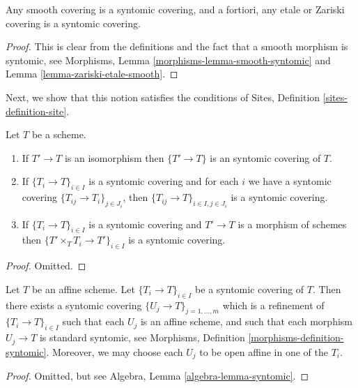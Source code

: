 \begin{lemma}
\label{lemma-zariski-etale-smooth-syntomic}
Any smooth covering is a syntomic covering, and a fortiori,
any etale or Zariski covering is a syntomic covering.
\end{lemma}

\begin{proof}
This is clear from the definitions and the fact that a smooth
morphism is syntomic, see
Morphisms, Lemma \ref{morphisms-lemma-smooth-syntomic}
and Lemma \ref{lemma-zariski-etale-smooth}.
\end{proof}

\noindent
Next, we show that this notion satisfies the conditions of
Sites, Definition \ref{sites-definition-site}.

\begin{lemma}
\label{lemma-syntomic}
Let $T$ be a scheme.
\begin{enumerate}
\item If $T' \to T$ is an isomorphism then $\{T' \to T\}$
is an syntomic covering of $T$.
\item If $\{T_i \to T\}_{i\in I}$ is a syntomic covering and for each
$i$ we have a syntomic covering $\{T_{ij} \to T_i\}_{j\in J_i}$, then
$\{T_{ij} \to T\}_{i \in I, j\in J_i}$ is a syntomic covering.
\item If $\{T_i \to T\}_{i\in I}$ is a syntomic covering
and $T' \to T$ is a morphism of schemes then
$\{T' \times_T T_i \to T'\}_{i\in I}$ is a syntomic covering.
\end{enumerate}
\end{lemma}

\begin{proof}
Omitted.
\end{proof}

\begin{lemma}
\label{lemma-syntomic-affine}
Let $T$ be an affine scheme.
Let $\{T_i \to T\}_{i \in I}$ be a syntomic covering of $T$.
Then there exists a syntomic covering
$\{U_j \to T\}_{j = 1, \ldots, m}$ which is a refinement
of $\{T_i \to T\}_{i \in I}$ such that each $U_j$ is an affine
scheme, and such that each morphism $U_j \to T$ is standard
syntomic, see Morphisms, Definition \ref{morphisms-definition-syntomic}.
Moreover, we may choose each $U_j$ to be open affine in one of the $T_i$.
\end{lemma}

\begin{proof}
Omitted, but see Algebra, Lemma \ref{algebra-lemma-syntomic}.
\end{proof}

